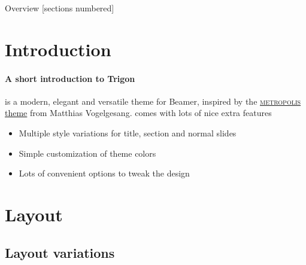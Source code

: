 \titleframe

\begin{frame}{Overview}
  [sections numbered]
  \tableofcontents[hideallsubsections]
\end{frame}


\section{Introduction}

\begin{frame}{\insertsectionhead}
  \framesubtitle{A short introduction to Trigon}
  \themename is a modern, elegant and versatile theme for Beamer, inspired by
  the
  \href{https://github.com/matze/mtheme}{\textsc{metropolis} theme} from Matthias
  Vogelgesang.
  \vfill
  \themename comes with lots of nice extra features
  \begin{itemize}
    \item Multiple style variations for title, section and normal slides
    \item Simple customization of theme colors
    \item Lots of convenient options to tweak the design
  \end{itemize}
\end{frame}


\section{Layout}

\subsection{Layout variations}

